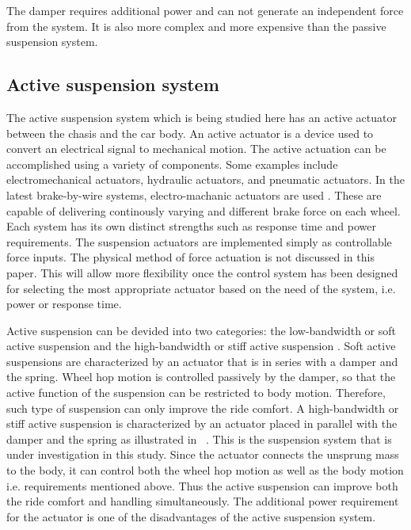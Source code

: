 \documentclass[10pt,twocolumn]{witseiepaper}
\begin{document}
The damper requires additional power and can not generate an independent force from the system. It is also more complex and more expensive than the passive suspension system.

\subsection{Active suspension system} 

The active suspension system which is being studied here has an active actuator between the chasis and the car body. An active actuator is a device used to convert an electrical signal to mechanical motion. The active actuation can be accomplished using a variety of components. Some examples include electromechanical actuators, hydraulic actuators, and pneumatic actuators. In the latest brake-by-wire systems, electro-machanic actuators are used \cite{Ghita:2008}. These are capable of delivering continously varying and different brake force on each wheel. Each system has its own distinct strengths such as response time and power requirements. The suspension actuators are implemented simply as controllable force inputs. The physical method of force actuation is not discussed in this paper. This will allow more flexibility once the control system has been designed for selecting the most appropriate actuator based on the need of the system, i.e. power or response time. 

Active suspension can be devided into two categories: the low-bandwidth or soft active suspension and the high-bandwidth or stiff active suspension \cite{Crolla:1988}. Soft active suspensions are characterized by an actuator that is in series with a damper and the spring. Wheel hop motion is controlled passively by the damper, so that the active function of the suspension can be restricted to body motion. Therefore, such type of suspension can only improve the ride comfort. A high-bandwidth or stiff active suspension is characterized by an actuator placed in parallel with the damper and the spring as illustrated in ~. This is the suspension system that is under investigation in this study. Since the actuator connects the unsprung mass to the body, it can control both the wheel hop motion as well as the body motion \cite{Williams:1994, Wright:1984} i.e. requirements mentioned above. Thus the active suspension can improve both the ride comfort and handling simultaneously. The additional power requirement for the actuator is one of the disadvantages of the active suspension system. 
\end{document}
